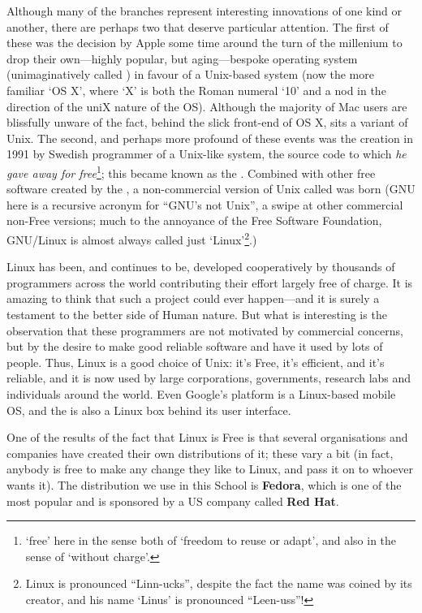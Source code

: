Although many of the branches represent interesting innovations of one kind or another, there are perhaps two that deserve particular attention. The first of these was the decision by Apple some time around the turn of the millenium to drop their own---highly popular, but aging---bespoke operating system (unimaginatively called ) in favour of a Unix-based system (now the more familiar `OS X', where `X' is both the Roman numeral `10' and a nod in the direction of the uniX nature of the OS). Although the majority of Mac users are blissfully unware of the fact, behind the slick front-end of OS X, sits a variant of Unix. The second, and perhaps more profound of these events was the creation in 1991 by Swedish programmer  of a Unix-like system, the source code to which \emph{he gave away for free}\footnote{`free' here in the sense both of `freedom to reuse or adapt', and also in the sense of `without charge'.}; this became known as the . Combined with other free software created by the , a non-commercial version of Unix called  was born (GNU here is a recursive acronym for ``GNU's not Unix'', a swipe at other commercial non-Free versions; much to the annoyance of the Free Software Foundation, GNU/Linux is almost always called just `Linux'\footnote{Linux
is pronounced ``Linn-ucks'', despite the fact the name was coined by
its creator, and his name `Linus' is pronounced
``Leen-uss''!}.) 

Linux has been, and continues to be, developed cooperatively by
thousands of programmers across the world contributing their effort
largely free of charge. It is amazing to think that such
a project could ever happen---and it is surely a testament to the
better side of Human nature. But what is interesting is the
observation that these programmers are not motivated by commercial
concerns, but by the desire to make good reliable software and have it
used by lots of people. Thus, Linux is a good choice of Unix: it's
Free, it's efficient, and it's reliable, and it is now used by large corporations, governments, research labs and individuals around the world. Even Google's  platform is a Linux-based mobile OS, and the   is also a Linux box behind its user interface.

One of the results of the fact that Linux is Free is that several
organisations and companies have created their own distributions of
it; these vary a bit (in fact, anybody is free to make any change they
like to Linux, and pass it on to whoever wants it). The distribution
we use in this School is \textbf{Fedora}, which is
one of the most popular and is sponsored by a
US company called \textbf{Red Hat}.

